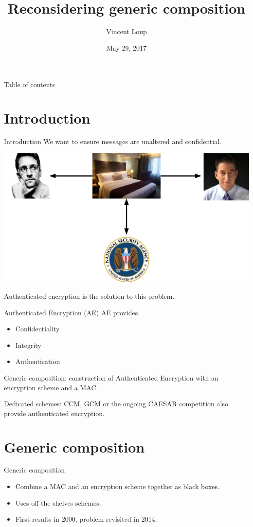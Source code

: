 \documentclass[11pt]{beamer}
\author{Vincent Loup}
\title{Reconsidering generic composition}
\institute{EPFL}
\date{May 29, 2017}
\begin{document}
\begin{frame}
\titlepage
\end{frame}

\begin{frame}{Table of contents}
\tableofcontents
\end{frame}

\section{Introduction}
\begin{frame}{Introduction}
We want to ensure messages are unaltered and confidential.

\begin{center}
\includegraphics[scale=0.04]{alicebob.jpg}
\end{center}

Authenticated encryption is the solution to this problem.
\end{frame}

\begin{frame}{Authenticated Encryption (AE)}
AE provides
\begin{itemize}
\item Confidentiality
\item Integrity
\item Authentication
\end{itemize}

Generic composition: construction of Authenticated Encryption with an encryption scheme and a MAC.

Dedicated schemes: CCM, GCM or the ongoing CAESAR competition also provide authenticated encryption.
\end{frame}

\section{Generic composition}
\begin{frame}{Generic composition}
\begin{itemize}
\item Combine a MAC and an encryption scheme together as black boxes.
\item Uses off the shelves schemes.
\item First results in 2000, problem revisited in 2014.
\end{itemize}
\end{frame}
\end{document}
